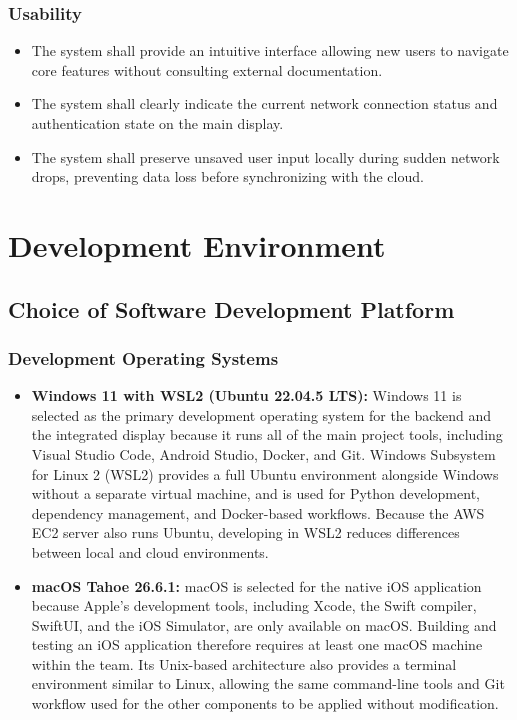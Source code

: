 \documentclass[conference]{IEEEtran}
\begin{document}
\subsubsection{Usability}
\begin{itemize}
    \item The system shall provide an intuitive interface allowing new users to navigate core features without consulting external documentation.
    \item The system shall clearly indicate the current network connection status and authentication state on the main display.
    \item The system shall preserve unsaved user input locally during sudden network drops, preventing data loss before synchronizing with the cloud.
\end{itemize}

\section{Development Environment}

\subsection{Choice of Software Development Platform}

\subsubsection{Development Operating Systems}
\begin{itemize}
    \item \textbf{Windows 11 with WSL2 (Ubuntu 22.04.5 LTS):} Windows 11 is selected as the primary development operating system for the backend and the integrated display because it runs all of the main project tools, including Visual Studio Code, Android Studio, Docker, and Git. Windows Subsystem for Linux 2 (WSL2) provides a full Ubuntu environment alongside Windows without a separate virtual machine, and is used for Python development, dependency management, and Docker-based workflows. Because the AWS EC2 server also runs Ubuntu, developing in WSL2 reduces differences between local and cloud environments.
    \item \textbf{macOS Tahoe 26.6.1:} macOS is selected for the native iOS application because Apple's development tools, including Xcode, the Swift compiler, SwiftUI, and the iOS Simulator, are only available on macOS. Building and testing an iOS application therefore requires at least one macOS machine within the team. Its Unix-based architecture also provides a terminal environment similar to Linux, allowing the same command-line tools and Git workflow used for the other components to be applied without modification.
\end{itemize}
\end{document}
